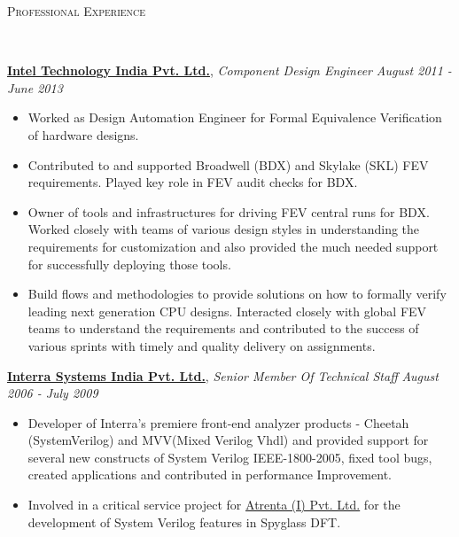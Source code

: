 \documentclass[9pt]{article}
\newenvironment{changemargin}[2]{%
  \begin{list}{}{%
    \setlength{\topsep}{0pt}%
    \setlength{\leftmargin}{#1}%
    \setlength{\rightmargin}{#2}%
    \setlength{\listparindent}{\parindent}%
    \setlength{\itemindent}{\parindent}%
    \setlength{\parsep}{\parskip}%
  }%
  \item[]}{\end{list}
}
\newcommand{\lineover}{
	\begin{changemargin}{-0.05in}{-0.05in}
		\vspace*{-8pt}
		\hrulefill \\
		\vspace*{-2pt}
	\end{changemargin}
}
\newcommand{\header}[1]{
	\begin{changemargin}{-0.5in}{-0.5in}
		\scshape{#1}\\
  	\lineover
	\end{changemargin}
}
\newenvironment{body} {
	\vspace*{-16pt}
	\begin{changemargin}{-0.25in}{-0.5in}
  }	
	{\end{changemargin}
}
\begin{document}
\header{Professional Experience}

\begin{body}
	\vspace{14pt}
	\href{http://www.intel.in/content/www/in/en/homepage.html}{\textbf{Intel Technology India Pvt. Ltd.}}, \emph{Component Design Engineer} \hfill \emph{August 2011 - June 2013}\\
	\vspace*{-4pt}
	\begin{itemize} \itemsep -0pt  %
                \item Worked as Design Automation Engineer for Formal Equivalence Verification of hardware designs.
                \item Contributed to and supported Broadwell (BDX) and Skylake (SKL) FEV requirements. Played key role in FEV audit checks for BDX. 
                \item Owner of tools and infrastructures for driving
                FEV central runs for  BDX. Worked closely with teams of various
                design styles in understanding the requirements for
                customization and also provided the much needed support for
                successfully deploying those tools.
                \item Build flows and methodologies to provide solutions on how
                to formally verify leading next generation CPU designs.
                Interacted closely with global FEV teams to understand the
                requirements and contributed to the success of various
                sprints with timely and quality delivery on assignments.
                \end{itemize}

	\href{http://www.interrasystems.com/}{\textbf {Interra Systems India Pvt. Ltd.}}, \emph{Senior Member Of Technical Staff} \hfill \emph{August 2006 - July 2009}\\
	\vspace*{-4pt}
	\begin{itemize} \itemsep -0pt
		\item Developer of Interra's premiere front-end analyzer products - Cheetah (SystemVerilog) and MVV(Mixed Verilog Vhdl) and 
		provided support for several new constructs of System Verilog IEEE-1800-2005, fixed tool bugs, created applications and contributed in performance Improvement. 		
		\item Involved in a critical service project for \href{http://www.atrenta.com/}{Atrenta (I) Pvt. Ltd.} for the development of System Verilog features in Spyglass DFT.
	\end{itemize}
\end{body}
\end{document}

